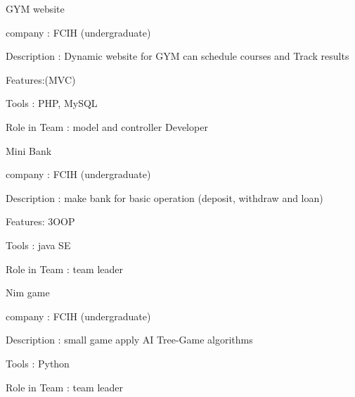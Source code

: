 \documentclass[a4paper,13pt,final]{memoir}
\newcommand{\Sep}{\vspace{1.5em}}
\newcommand{\SmallSep}{\vspace{0.5em}}
\begin{document}
\begin{compactitem}[\color{RoyalBlue}$\circ$]

	
	\item GYM website
	\begin{compactitem}[\color{RoyalBlue}$\circ$]
		\item company : FCIH (undergraduate)
		\item Description : Dynamic website for GYM can schedule courses and Track
results
		\item Features:(MVC)
		\item Tools : PHP, MySQL
		\item Role in Team : model and controller Developer
	\end{compactitem}
	\SmallSep
	
	\item Mini Bank
	\begin{compactitem}[\color{RoyalBlue}$\circ$]
		\item company : FCIH (undergraduate)
		\item Description : make bank for basic operation (deposit, withdraw and loan)
		\item Features: 3OOP
		\item Tools : java SE
		\item Role in Team : team leader
	\end{compactitem}
	\SmallSep

	\item Nim game
	\begin{compactitem}[\color{RoyalBlue}$\circ$]
		\item company : FCIH (undergraduate)
		\item Description : small game apply AI Tree-Game algorithms
		\item Tools : Python
		\item Role in Team : team leader
	\end{compactitem}
	\SmallSep

\Sep
	
\end{compactitem}
\SmallSep
\end{document}
